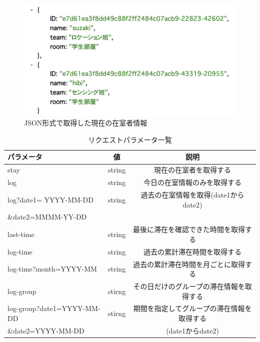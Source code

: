 \begin{figure}[H]
  \begin{center}
    \includegraphics[width=160mm]{image/jsonstay.png}
    \caption{JSON形式で取得した現在の在室者情報}
    \label{jsonstay}
  \end{center}
\end{figure}
\begin{table}[H]
  \begin{center}
    \caption{リクエストパラメータ一覧}
    \label{request}
    \begin{tabular}{|l|c|c|} \hline
      パラメータ                  & 値      & 説明                       \\ \hline
      stay                   & string & 現在の在室者を取得する              \\ \hline
      log                    & string & 今日の在室情報のみを取得する           \\ \hline
      log?date1= YYYY-MM-DD
                             & string & 過去の在室情報を取得(date1からdate2) \\

      \&date2=MMMM-YY-DD     &        &                          \\\hline
      last-time              & string & 最後に滞在を確認できた時間を取得する       \\ \hline
      log-time               & string & 過去の累計滞在時間を取得する           \\ \hline
      log-time?month=YYYY-MM & string & 過去の累計滞在時間を月ごとに取得する       \\ \hline
      log-group              & stirng & その日だけのグループの滞在情報を取得する     \\ \hline
      log-group?date1=YYYY-MM-DD
                             & stirng & 期間を指定してグループの滞在情報を取得する    \\
      \&date2=YYYY-MM-DD     &        & (date1からdate2)           \\\hline
    \end{tabular}
  \end{center}
\end{table}